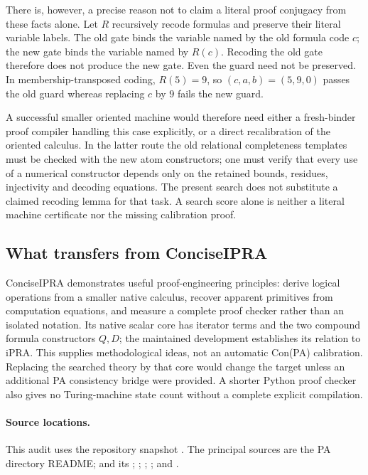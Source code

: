 There is, however, a precise reason not to claim a literal proof conjugacy
from these facts alone. Let $R$ recursively recode formulas and preserve
their literal variable labels. The old gate binds the variable named by
the old formula code $c$; the new gate binds the variable named by $R(c)$.
Recoding the old gate therefore does not produce the new gate. Even the
guard need not be preserved. In membership-transposed coding,
$R(5)=9$, so $(c,a,b)=(5,9,0)$ passes the old guard whereas replacing
$c$ by $9$ fails the new guard.

A successful smaller oriented machine would therefore need either a
fresh-binder proof compiler handling this case explicitly, or a direct
recalibration of the oriented calculus. In the latter route the old
relational completeness templates must be checked with the new atom
constructors; one must verify that every use of a numerical constructor
depends only on the retained bounds, residues, injectivity and decoding
equations. The present search does not substitute a claimed recoding
lemma for that task. A search score alone is neither a literal machine
certificate nor the missing calibration proof.

\subsection{What transfers from ConciseIPRA}

ConciseIPRA demonstrates useful proof-engineering principles: derive
logical operations from a smaller native calculus, recover apparent
primitives from computation equations, and measure a complete proof checker
rather than an isolated notation. Its native scalar core has iterator
terms and the two compound formula constructors $Q,D$; the maintained
development establishes its relation to iPRA. This supplies methodological
ideas, not an automatic Con(PA) calibration. Replacing the searched theory
by that core would change the target unless an additional PA consistency
bridge were provided. A shorter Python proof checker also gives no
Turing-machine state count without a complete explicit compilation.

\paragraph{Source locations.}
This audit uses the repository snapshot
.
The principal sources are the PA directory README;
 and its
;
;
;
;
and .

